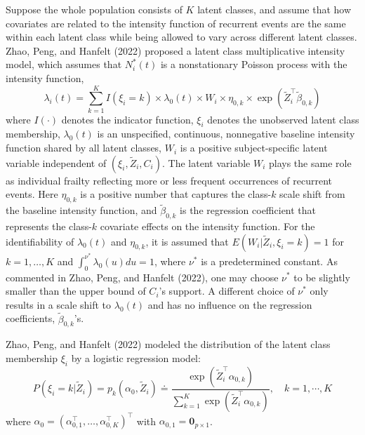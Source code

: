 Suppose the whole population consists of \(K\) latent classes, and assume that how covariates are related to the intensity function of recurrent events are the same within each latent class while being allowed to vary across different latent classes. Zhao, Peng, and Hanfelt (2022) proposed a latent class multiplicative intensity model, which assumes that \(N_i^*(t)\) is a nonstationary Poisson process with the intensity function,
\begin{equation} 
\label{eq:1}
\lambda _{i} (t) = \sum _{k = 1} ^{K} I (\xi _{i} = k) \times \lambda _{0} (t) \times W_{i} \times \eta _{0,k} \times \exp(\tilde{Z} _{i} ^{\top} \tilde{\beta} _{0,k}) 
\end{equation}
where \(I(\cdot)\) denotes the indicator function, \(\xi_i\) denotes the unobserved latent class membership, \(\lambda _{0} (t)\) is an unspecified, continuous, nonnegative baseline intensity function shared by all latent classes, \(W_{i}\) is a positive subject-specific latent variable independent of \((\xi_i, \tilde{Z}_i, C_i)\). The latent variable \(W_i\) plays the same role as individual frailty reflecting more or less frequent occurrences of recurrent events. Here \(\eta _{0,k}\) is a positive number that captures the class-\(k\) scale shift from the baseline intensity function, and \(\tilde{\beta} _{0,k}\) is the regression coefficient that represents the class-\(k\) covariate effects on the intensity function. For the identifiability of \(\lambda_{0}(t)\) and \(\eta _{0,k}\), it is assumed that \(E(W_{i} | \tilde {Z} _{i} , \xi _{i} = k) = 1\) for \(k = 1, \dots, K\) and \(\int _{0}^{\nu^{*}} \lambda_{0} (u) du = 1\), where \(\nu^{*}\) is a predetermined constant. As commented in Zhao, Peng, and Hanfelt (2022), one may choose \(\nu^{*}\) to be slightly smaller than the upper bound of \(C_i\)'s support. A different choice of \(\nu^{*}\) only results in a scale shift to \(\lambda_{0}(t)\) and has no influence on the regression coefficients, \(\tilde{\beta} _{0,k}\)'s.

Zhao, Peng, and Hanfelt (2022) modeled the distribution of the latent class membership \(\xi_i\) by a
logistic regression model:
\begin{equation} 
\label{eq:2}
P(\xi _{i} = k | \tilde{Z} _{i}) = p_{k} (\alpha _{0} , \tilde{Z} _{i}) \doteq \frac{\exp(\tilde{Z} _{i} ^{\top} \alpha _{0,k})}{\sum_{k = 1}^{K}\exp(\tilde{Z} _{i} ^{\top} \alpha _{0,k}) } , \quad k = 1, \cdots, K 
\end{equation}
where \(\alpha_0=(\alpha_{0,1}^\top,\ldots, \alpha_{0, K}^\top)^\top\) with \(\alpha_{0,1} = \textbf{0}_{p\times 1}\).

